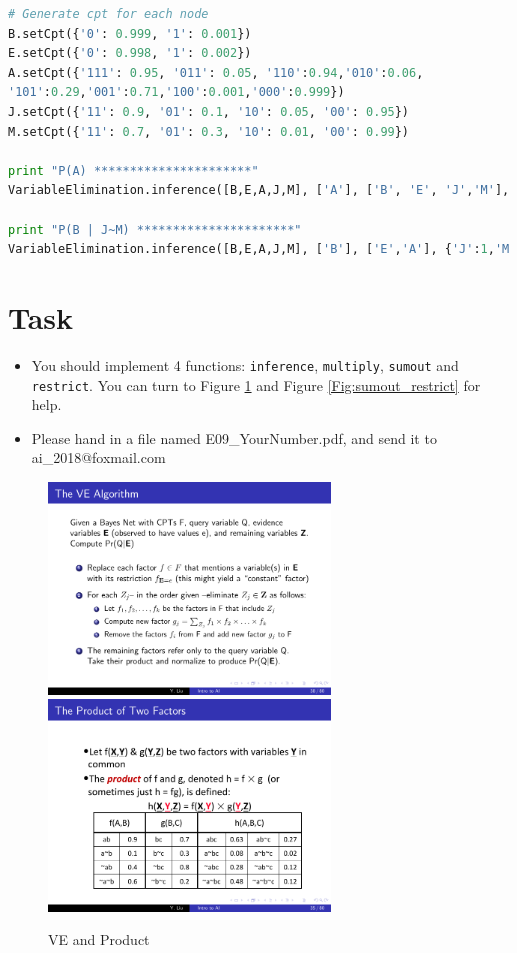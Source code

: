 ﻿\documentclass[a4paper, 11pt]{article}
\begin{document}
\begin{lstlisting}[language=Python,frame=single]
# Generate cpt for each node
B.setCpt({'0': 0.999, '1': 0.001})
E.setCpt({'0': 0.998, '1': 0.002})
A.setCpt({'111': 0.95, '011': 0.05, '110':0.94,'010':0.06,
'101':0.29,'001':0.71,'100':0.001,'000':0.999})
J.setCpt({'11': 0.9, '01': 0.1, '10': 0.05, '00': 0.95})
M.setCpt({'11': 0.7, '01': 0.3, '10': 0.01, '00': 0.99})

print "P(A) **********************"
VariableElimination.inference([B,E,A,J,M], ['A'], ['B', 'E', 'J','M'], {})

print "P(B | J~M) **********************"
VariableElimination.inference([B,E,A,J,M], ['B'], ['E','A'], {'J':1,'M':0})
\end{lstlisting}
\section{Task}
\begin{itemize}
\item You should implement 4 functions: \texttt{inference}, \texttt{multiply}, \texttt{sumout} and \texttt{restrict}. You can turn to Figure \ref{Fig:ve_product} and Figure \ref{Fig:sumout_restrict} for help.
\item Please hand in a file named \textsf{E09\_YourNumber.pdf}, and send it to \textsf{ai\_2018@foxmail.com}
\end{itemize}


\begin{figure}[ht]{}
\centering
\includegraphics[width=7.5cm]{Pic/ve}
\qquad
\includegraphics[width=7.5cm]{Pic/product}
\caption{VE and Product}
\label{Fig:ve_product}
\end{figure}
\end{document}

